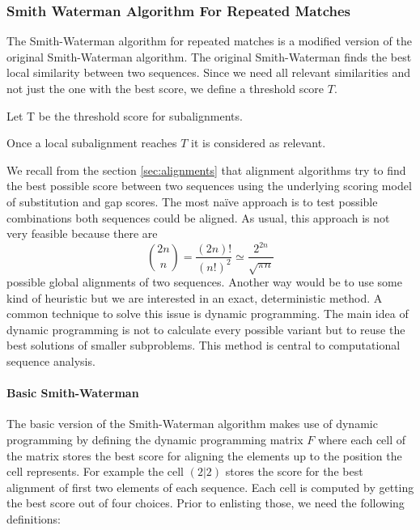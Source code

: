 \subsubsection{Smith Waterman Algorithm For Repeated Matches}
The Smith-Waterman algorithm for repeated matches\cite{durbin1998} is a modified version of the original Smith-Waterman algorithm\cite{waterman1981}.
The original Smith-Waterman finds the best local similarity between two sequences.
Since we need all relevant similarities and not just the one with the best score, we define a threshold score $T$.
\begin{definition}
	Let T be the threshold score for subalignments.
	\label{def:treshold}
\end{definition}
Once a local subalignment reaches $T$ it is considered as relevant.

We recall from the section \ref{sec:alignments} that alignment algorithms try to find the best possible score between two sequences using the underlying scoring model of substitution and gap scores.
The most na\"ive approach is to test possible combinations both sequences could be aligned. As usual, this approach is not very feasible because there are
\begin{equation*}
	\binom{2n}{n} = \frac{(2n)!}{(n!)^2} \simeq \frac{2^{2n}}{\sqrt{\pi n}}
\end{equation*}
possible global alignments of two sequences\cite{durbin1998}.
Another way would be to use some kind of heuristic but we are interested in an exact, deterministic method.
A common technique to solve this issue is dynamic programming\cite{bellman1957}.
The main idea of dynamic programming is not to calculate every possible variant but to reuse the best solutions of smaller subproblems.
This method is central to computational sequence analysis\cite{durbin1998}.

\paragraph{Basic Smith-Waterman}
The basic version of the Smith-Waterman algorithm makes use of dynamic programming by defining the dynamic programming matrix $F$ where each cell of the matrix stores the best score for aligning the elements up to the position the cell represents.
For example the cell $(2|2)$ stores the score for the best alignment of first two elements of each sequence.
Each cell is computed by getting the best score out of four choices. Prior to enlisting those, we need the following definitions:

